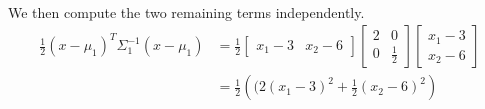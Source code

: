 \documentclass[a4paper, 10pt, twoside]{article}
\begin{document}
\begin{enumerate}[a)]
\begin{align*}
          \end{align*}
          We then compute the two remaining terms independently.
          \begin{align*}
              \frac{1}{2} (x - \mu_1)^T \Sigma_1^{-1}(x - \mu_1)
               & =
              \frac{1}{2}
            \begin{bmatrix}x_1-3 & x_2-6\end{bmatrix}
            \begin{bmatrix}2 & 0 \\ 0 & \frac{1}{2}\end{bmatrix}
            \begin{bmatrix}x_1-3 \\ x_2-6\end{bmatrix} \\
                &=
            \frac{1}{2}\left((2(x_1-3)^2 + \frac{1}{2}(x_2-6)^2\right)
          \end{align*}
\end{enumerate}
\end{document}

